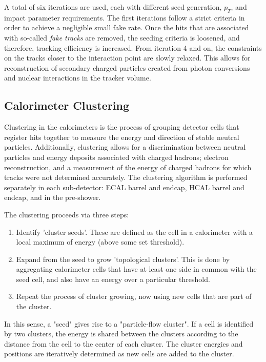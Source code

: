 A total of six iterations are used, each with different seed generation, $p_{T}$, and impact parameter requirements. The first iterations follow a strict criteria in order to achieve a negligible small fake rate. Once the hits that are associated with so-called \textit{fake tracks} are removed, the seeding criteria is loosened, and therefore, tracking efficiency is increased. From iteration 4 and on, the constraints on the tracks closer to the interaction point are slowly relaxed. This allows for reconstruction of secondary charged particles created from photon conversions and nuclear interactions in the tracker volume.

\subsection{Calorimeter Clustering}
Clustering in the calorimeters is the process of grouping detector cells that register hits together to measure the energy and direction of stable neutral particles. Additionally, clustering allows for a discrimination between neutral particles and energy deposits associated with charged hadrons; electron reconstruction, and a measurement of the energy of charged hadrons for which tracks were not determined accurately. The clustering algorithm is performed separately in each sub-detector: ECAL barrel and endcap, HCAL barrel and endcap, and in the pre-shower.

The clustering proceeds via three steps\cite{CMS:2009nxa}:

\begin{enumerate}
	\item Identify 'cluster seeds'. These are defined as the cell in a calorimeter with a local maximum of energy (above some set threshold).
	\item Expand from the seed to grow 'topological clusters'. This is done by aggregating calorimeter cells that have at least one side in common with the seed cell, and also have an energy over a particular threshold.
	\item Repeat the process of cluster growing, now using new cells that are part of the cluster.
\end{enumerate}

In this sense, a "seed" gives rise to a "particle-flow cluster". If a cell is identified by two clusters, the energy is shared between the clusters according to the distance from the cell to the center of each cluster. The cluster energies and positions are iteratively determined as new cells are added to the cluster.

